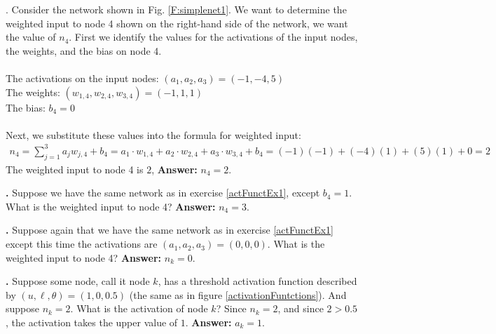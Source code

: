 \noindent

\label{actFunctEx1}
\noindent
{\bf \theActFunctionCounter}. Consider the network shown in Fig. \ref{F:simplenet1}. We want to determine the weighted 
input to node 4 shown on the right-hand side of the network, \ie we want the
value of $n_4$. First we identify the values for the activations of the input 
nodes, the weights, and the bias on node 4. \\ \\
\indent \qquad\qquad The activations on the input nodes: $(a_1,a_2,a_3) = 
(-1,-4,5)$ \\
\indent \qquad\qquad The weights: $(w_{1,4}, w_{2,4}, w_{3,4}) = (-1,1,1)$ \\
\indent \qquad\qquad The bias: $b_4 = 0$ \\ \\
Next, we substitute these values into the formula for weighted input:
\begin{eqnarray*}
n_4 = \sum_{j=1}^{3}  a_j  w_{j,4} + b_4 
    =  a_1 \cdot w_{1,4} + a_2 \cdot w_{2,4} + a_3 \cdot w_{3,4} + b_4 
    =      (-1)(-1)      +      (-4)(1)      +       (5)(1)      + 0 
    = 2
\end{eqnarray*}
The weighted input to node 4 is $2$, {\bf Answer:} $n_4=2$.

\bigskip

\noindent

{\bf \theActFunctionCounter.} Suppose we have the same network as in exercise \ref{actFunctEx1}, except 
$b_4 = 1$. What is the weighted input to node 4? {\bf Answer:} $n_4=3$.

\bigskip

\noindent
{\bf \theActFunctionCounter.} Suppose again that we have the same network as in exercise \ref{actFunctEx1} except this time the activations are $(a_1,a_2,a_3) = (0,0,0)$. What is the 
weighted input to node 4? {\bf Answer:} $n_k=0$.

\bigskip

\noindent
{\bf \theActFunctionCounter.} Suppose some node, call it node $k$, has a threshold 
activation function described by $(u,\ell,\theta) = (1,0,0.5)$ (the same as in 
figure \ref{activationFuntctions}). And suppose $n_k = 2$. What is the activation 
of node $k$?  Since $n_k = 2$, and since $2 > 0.5$, the activation takes the 
upper value of $1$. {\bf Answer:} $a_k=1$.

\bigskip

